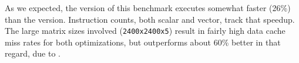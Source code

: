 As we expected, the \awlf version of this benchmark executes
somewhat faster (26\%) than the \wlf version. Instruction counts,
both scalar and vector, track that speedup. The large matrix
sizes involved ({\tt 2400x2400x5}) result in fairly high
data cache miss rates for both optimizations, but \awlf
outperforms \wlf about 60\% better in that regard, due to
.

